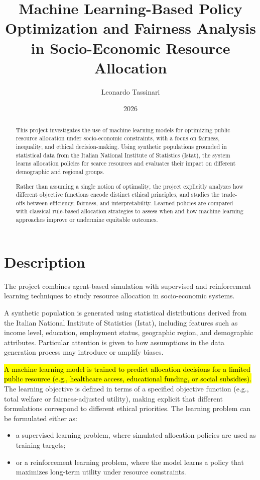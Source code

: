 \documentclass[11pt]{article}
\title{Machine Learning-Based Policy Optimization and Fairness Analysis in Socio-Economic Resource Allocation}
\author{Leonardo Tassinari}
\date{2026}
\begin{document}
\maketitle

\begin{abstract}
This project investigates the use of machine learning models for optimizing public resource allocation under socio-economic constraints, with a focus on fairness, inequality, and ethical decision-making. Using synthetic populations grounded in statistical data from the Italian National Institute of Statistics (Istat), the system learns allocation policies for scarce resources and evaluates their impact on different demographic and regional groups. 

Rather than assuming a single notion of optimality, the project explicitly analyzes how different objective functions encode distinct ethical principles, and studies the trade-offs between efficiency, fairness, and interpretability. Learned policies are compared with classical rule-based allocation strategies to assess when and how machine learning approaches improve or undermine equitable outcomes.
\end{abstract}

\section{Description}

The project combines agent-based simulation with supervised and reinforcement learning techniques to study resource allocation in socio-economic systems.

A synthetic population is generated using statistical distributions derived from the Italian National Institute of Statistics (Istat), including features such as income level, education, employment status, geographic region, and demographic attributes. Particular attention is given to how assumptions in the data generation process may introduce or amplify biases.

\hl{A machine learning model is trained to predict allocation decisions for a limited public resource (e.g., healthcare access, educational funding, or social subsidies).} The learning objective is defined in terms of a specified objective function (e.g., total welfare or fairness-adjusted utility), making explicit that different formulations correspond to different ethical priorities. The learning problem can be formulated either as:

\begin{itemize}
    \item a supervised learning problem, where simulated allocation policies are used as training targets;
    \item or a reinforcement learning problem, where the model learns a policy that maximizes long-term utility under resource constraints.
\end{itemize}
\end{document}
